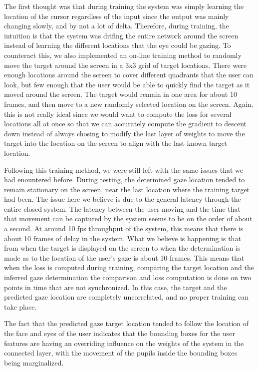 \documentclass[10pt,twocolumn,letterpaper]{article}
\begin{document}
The first thought was that during training the system was simply
learning the location of the cursor regardless of the input since the
output was mainly changing slowly, and by not a lot of
delta. Therefore, during training, the intuition is that the system
was drifing the entire network around the screen instead of learning
the different locations that the eye could be gazing. To counteract
this, we also implemented an on-line training method to randomly move
the target around the screen in a 3x3 grid of target locations. There
were enough locations around the screen to cover different quadrants
that the user can look, but few enough that the user would be able to
quickly find the target as it moved around the screen. The target
would remain in one area for about 10 frames, and then move to a new
randomly selected location on the screen. Again, this is not really
ideal since we would want to compute the loss for several locations
all at once so that we can accurately compute the gradient to descent
down instead of always chosing to modify the last layer of weights to
move the target into the location on the screen to align with the last
known target location. 

Following this training method, we were still left with the same
issues that we had enountered before. During testing, the determined
gaze location tended to remain stationary on the screen, near the last
location where the training target had been. The issue here we believe
is due to the general latency through the entire closed system. The
latency between the user moving and the time that that movement can be
captured by the system seems to be on the order of about a
second. At around 10 fps throughput of the system, this means that
there is about 10 frames of delay in the system. What we believe is
happening is that from when the target is displayed on the screen to
when the determination is made as to the location of the user's gaze
is about 10 frames. This means that when the loss is computed during
training, comparing the target location and the inferred gaze
determination the comparison and loss computation is done on two
points in time that are not synchronized. In this case, the target and
the predicted gaze location are completely uncorrelated, and no proper
training can take place.

The fact that the predicted gaze target location tended to follow the
location of the face and eyes of the user indicates that the bounding
boxes for the user features are having an overriding influence on the
weights of the system in the connected layer, with the movement of the
pupils inside the bounding boxes being marginalized.
\end{document}
